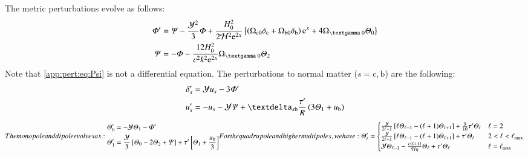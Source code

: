 The metric perturbations evolve as follows:
\begin{subequations}\label{app:pert:eq:metric_perturbations}
\begin{align} 
    \Phi' &= \Psi - \frac{\ckH^2}{3} \Phi + \frac{H_0^2}{2\Hp^2\eu[2x]}\left\{ \left(\Omega\ped{c 0}\delta\ped{c} + \Omega\ped{b 0}\delta\ped{b} \right)\eu[x]+4\Omega\gped{\textgamma 0}\Theta_0\right\} \label{app:pert:eq:dPhidx}\\
    \Psi &= - \Phi - \frac{12H_0^2}{c^2k^2\eu^{2x}} \Omega\gped{\textgamma 0}\Theta_2 \label{app:pert:eq:Psi}
\end{align}
\end{subequations}
Note that \cref{app:pert:eq:Psi} is not a differential equation. The perturbations to normal matter ($s=\mathrm{c,b}$) are the following:
\begin{subequations}\label{app:pert:eq:matter_perturbations}
\begin{align}
    \delta_s'&=  \ckH u_s - 3\Phi'\label{app:pert:eq:ddelta_sdx}  \\
    u_s' &= - u_s - \ckH\Psi + \deltasym{s\mathrm{b}}  \frac{\tau'}{R} \left(3\Theta_1 +u\ped{b}\right)\label{app:pert:eq:du_sdx} 
\end{align}
\end{subequations}
\begin{subequations}\label{app:pert:eq:photon_multipoles}
The monopole and dipole evolves as:
\begin{align}
    \Theta_0' &= -\ckH \Theta_1 - \Phi ' \label{app:pert:eq:dTheta0dx}\\
    \Theta_1' &= \frac{\ckH}{3} \left[ \Theta_0 - 2\Theta_2 + \Psi \right] + \tau'\left[\Theta_1 + \frac{u\ped{b}}{3} \right] \label{app:pert:eq:dTheta1dx}
\end{align}
For the quadrupole and higher multipoles, we have:
\begin{align}
\Theta_\ell' = \begin{cases}
    \frac{\ckH}{2\ell + 1} \left[ \ell \Theta_{\ell-1}-  (\ell+1) \Theta_{\ell+1} \right] + \frac{9}{10}\tau ' \Theta_\ell & \ell = 2 \\ 
    \frac{\ckH}{2\ell + 1} \left[ \ell \Theta_{\ell-1}-  (\ell+1) \Theta_{\ell+1} \right] + \tau ' \Theta_\ell  & 2< \ell < \ell\ped{max} \\
    \ckH \Theta_{\ell-1} - \frac{c(\ell+1)}{\Hp \eta}\Theta_{\ell} + \tau' \Theta_{\ell}& \ell=\ell\ped{max}
\end{cases} \label{app:pert:eq:dThetaelldx}
\end{align}
\end{subequations}




